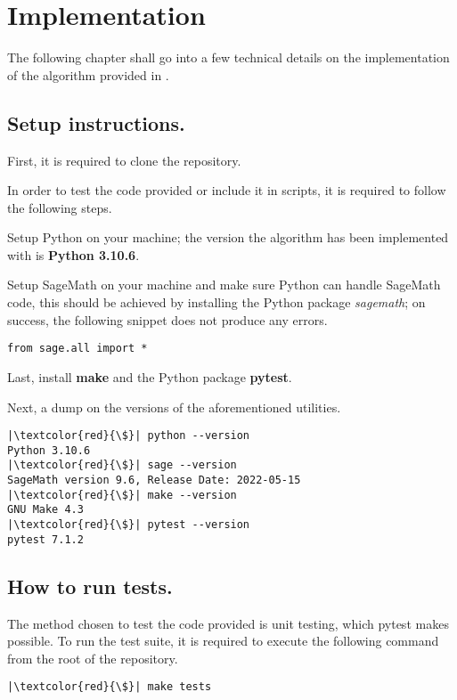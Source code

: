 \section{Implementation}
The following chapter shall go into a few technical details on the implementation of the algorithm provided in
\cite{Trapani_Computation_of_Kronecker_s}.

\subsection*{Setup instructions.}
First, it is required to clone the repository.

In order to test the code provided or include it in scripts, it is required to follow the following steps.

Setup Python \cite{van1995python} on your machine; the version the algorithm has been implemented with
is \textbf{Python 3.10.6}.

Setup SageMath \cite{sage} on your machine and make sure Python can handle SageMath code, this should be achieved
by installing the Python package \textit{sagemath}; on success, the following snippet does not produce any
errors.
\begin{verbatim}
from sage.all import *
\end{verbatim}

Last, install \textbf{make} and the Python package \textbf{pytest}.

Next, a dump on the versions of the aforementioned utilities.
\begin{verbatim}
|\textcolor{red}{\$}| python --version
Python 3.10.6
|\textcolor{red}{\$}| sage --version
SageMath version 9.6, Release Date: 2022-05-15
|\textcolor{red}{\$}| make --version
GNU Make 4.3
|\textcolor{red}{\$}| pytest --version
pytest 7.1.2
\end{verbatim}

\subsection*{How to run tests.}
The method chosen to test the code provided is unit testing, which pytest makes possible.
To run the test suite, it is required to execute the following command from the root of the repository.
\begin{verbatim}
|\textcolor{red}{\$}| make tests
\end{verbatim}

